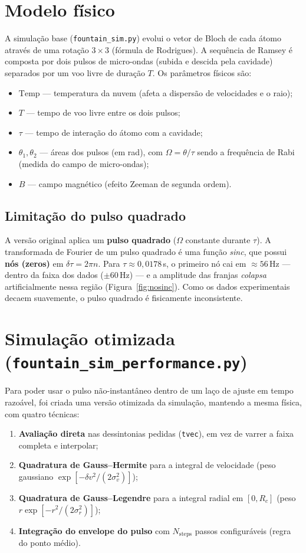 \documentclass[12pt,a4paper]{article}
\begin{document}
\section{Modelo físico}
A simulação base (\texttt{fountain\_sim.py}) evolui o vetor de Bloch de cada átomo através
de uma rotação $3\times3$ (fórmula de Rodrigues). A sequência de Ramsey é composta por dois
pulsos de micro-ondas (subida e descida pela cavidade) separados por um voo livre de
duração $T$. Os parâmetros físicos são:

\begin{itemize}
  \item $\mathrm{Temp}$ --- temperatura da nuvem (afeta a dispersão de velocidades e o raio);
  \item $T$ --- tempo de voo livre entre os dois pulsos;
  \item $\tau$ --- tempo de interação do átomo com a cavidade;
  \item $\theta_1,\theta_2$ --- áreas dos pulsos (em rad), com $\Omega = \theta/\tau$ sendo a
        frequência de Rabi (medida do campo de micro-ondas);
  \item $B$ --- campo magnético (efeito Zeeman de segunda ordem).
\end{itemize}

\subsection{Limitação do pulso quadrado}
A versão original aplica um \textbf{pulso quadrado} ($\Omega$ constante durante $\tau$). A
transformada de Fourier de um pulso quadrado é uma função \emph{sinc}, que possui
\textbf{nós (zeros)} em $\delta\tau = 2\pi n$. Para $\tau \approx 0{,}0178$\,s, o primeiro nó
cai em $\approx 56$\,Hz --- dentro da faixa dos dados ($\pm 60$\,Hz) --- e a amplitude das
franjas \emph{colapsa} artificialmente nessa região (Figura~\ref{fig:nosinc}). Como os dados
experimentais decaem suavemente, o pulso quadrado é fisicamente inconsistente.

\section{Simulação otimizada (\texttt{fountain\_sim\_performance.py})}
Para poder usar o pulso não-instantâneo dentro de um laço de ajuste em tempo razoável, foi
criada uma versão otimizada da simulação, mantendo a mesma física, com quatro técnicas:

\begin{enumerate}
  \item \textbf{Avaliação direta} nas dessintonias pedidas (\texttt{tvec}), em vez de varrer
        a faixa completa e interpolar;
  \item \textbf{Quadratura de Gauss--Hermite} para a integral de velocidade (peso gaussiano
        $\exp[-\delta v^2/(2\sigma_v^2)]$);
  \item \textbf{Quadratura de Gauss--Legendre} para a integral radial em $[0,R_c]$ (peso
        $r\exp[-r^2/(2\sigma_r^2)]$);
  \item \textbf{Integração do envelope do pulso} com $N_{\mathrm{steps}}$ passos
        configuráveis (regra do ponto médio).
\end{enumerate}
\end{document}
